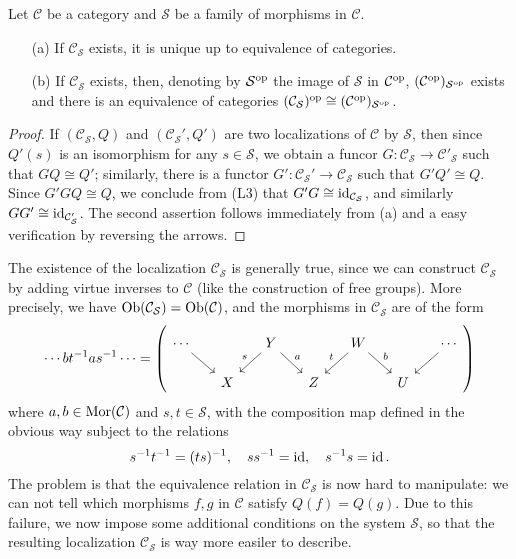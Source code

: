 \begin{proposition}\label{category localization opposite char}
Let $\mathcal{C}$ be a category and $\mathcal{S}$ be a family of morphisms in $\mathcal{C}$.
\begin{enumerate}
    \item[(a)] If $\mathcal{C}_\mathcal{S}$ exists, it is unique up to equivalence of categories.
    \item[(b)] If $\mathcal{C}_\mathcal{S}$ exists, then, denoting by $\mathcal{S}^{\mathrm{op}}$ the image of $\mathcal{S}$ in $\mathcal{C}^{\mathrm{op}}$, $(\mathcal{C}^{\mathrm{op}})_{\mathcal{S}^{\mathrm{op}}}$ exists and there is an equivalence of categories $(\mathcal{C}_\mathcal{S})^{\mathrm{op}}\cong(\mathcal{C}^{\mathrm{op}})_{\mathcal{S}^{\mathrm{op}}}$.
\end{enumerate}
\end{proposition}
\begin{proof}
If $(\mathcal{C}_\mathcal{S},Q)$ and $(\mathcal{C}_\mathcal{S}',Q')$ are two localizations of $\mathcal{C}$ by $\mathcal{S}$, then since $Q'(s)$ is an isomorphism for any $s\in\mathcal{S}$, we obtain a funcor $G:\mathcal{C}_\mathcal{S}\to\mathcal{C}'_\mathcal{S}$ such that $GQ\cong Q'$; similarly, there is a functor $G':\mathcal{C}_\mathcal{S}'\to\mathcal{C}_\mathcal{S}$ such that $G'Q'\cong Q$. Since $G'GQ\cong Q$, we conclude from (L3) that $G'G\cong\operatorname{id}_{\mathcal{C}_\mathcal{S}}$, and similarly $GG'\cong\operatorname{id}_{\mathcal{C}'_\mathcal{S}}$. The second assertion follows immediately from (a) and a easy verification by reversing the arrows.
\end{proof}

The existence of the localization $\mathcal{C}_\mathcal{S}$ is generally true, since we can construct $\mathcal{C}_\mathcal{S}$ by adding virtue inverses to $\mathcal{C}$ (like the construction of free groups). More precisely, we have $\mathrm{Ob}(\mathcal{C}_\mathcal{S})=\mathrm{Ob}(\mathcal{C})$, and the morphisms in $\mathcal{C}_\mathcal{S}$ are of the form
\[\cdots bt^{-1}as^{-1}\cdots=\left(\begin{tikzcd}[row sep=5mm, column sep=5mm]
\cdots\ar[rd]&&Y\ar[rd,"a"]\ar[ld,swap,"s"]&&W\ar[ld,swap,"t"]\ar[rd,"b"]&&\cdots\ar[ld]\\
&X&&Z&&U&
\end{tikzcd}\right)\]
where $a,b\in\mathrm{Mor}(\mathcal{C})$ and $s,t\in\mathcal{S}$, with the composition map defined in the obvious way subject to the relations
\[s^{-1}t^{-1}=(ts)^{-1},\quad ss^{-1}=\operatorname{id},\quad s^{-1}s=\operatorname{id}.\]
The problem is that the equivalence relation in $\mathcal{C}_\mathcal{S}$ is now hard to manipulate: we can not tell which morphisms $f,g$ in $\mathcal{C}$ satisfy $Q(f)=Q(g)$. Due to this failure, we now impose some additional conditions on the system $\mathcal{S}$, so that the resulting localization $\mathcal{C}_\mathcal{S}$ is way more easiler to describe.

